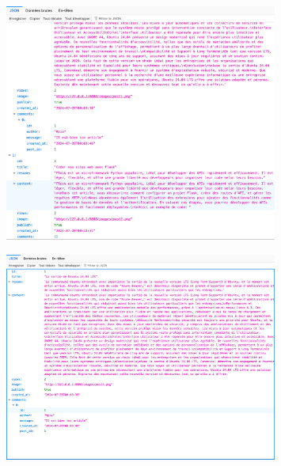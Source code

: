 \documentclass[a4paper,11pt]{article}
\begin{document}
            \newpage
            \begin{figure}[ht]
                \includegraphics[width=0.8\textwidth]{TP-3/EXERCICE-3.1-A-RENDRE/screenshots/posts.png}
            \end{figure}
            
            \newpage
            \begin{figure}[ht]
                \includegraphics[width=0.8\textwidth]{TP-3/EXERCICE-3.1-A-RENDRE/screenshots/post.png}
            \end{figure}
            
\end{document}
